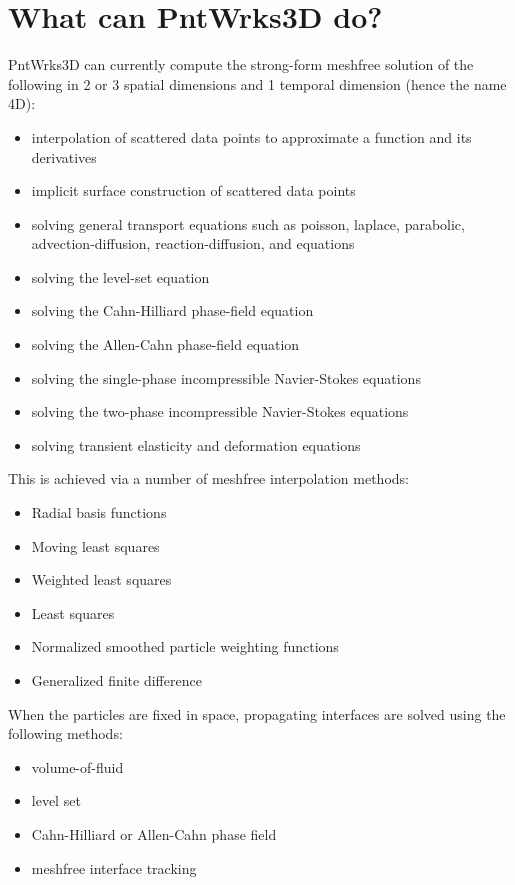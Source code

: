 \documentclass[12pt]{extarticle}
\begin{document}
\section{What can PntWrks3D do?}
PntWrks3D can currently compute the strong-form meshfree solution of the following in 2 or 3 spatial dimensions and 1 temporal dimension (hence the name 4D):
\begin{itemize}
\item interpolation of scattered data points to approximate a function and its derivatives
\item implicit surface construction of scattered data points
\item solving general transport equations such as poisson, laplace, parabolic, advection-diffusion, reaction-diffusion, and  equations
\item solving the level-set equation
\item solving the Cahn-Hilliard phase-field equation
\item solving the Allen-Cahn phase-field equation 
\item solving the single-phase incompressible Navier-Stokes equations
\item solving the two-phase incompressible Navier-Stokes equations
\item solving transient elasticity and deformation equations
\end{itemize}

\vspace{5 mm}
This is achieved via a number of meshfree interpolation methods:
\begin{itemize}
\item Radial basis functions
\item Moving least squares
\item Weighted least squares
\item Least squares
\item Normalized smoothed particle weighting functions
\item Generalized finite difference
\end{itemize}

\vspace{5 mm}
When the particles are fixed in space, propagating interfaces are solved using the following methods:
\begin{itemize}
\item volume-of-fluid
\item level set
\item Cahn-Hilliard or Allen-Cahn phase field
\item meshfree interface tracking
\end{itemize}
\end{document}
